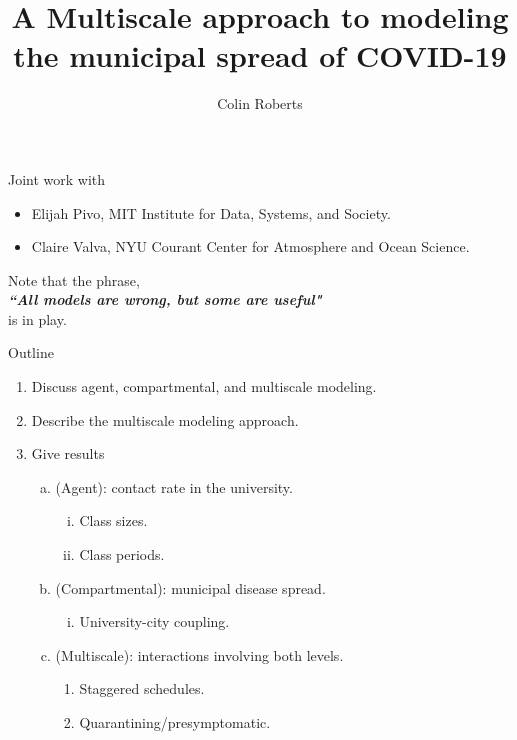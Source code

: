 \documentclass[aspectratio=169]{beamer}
\author{Colin Roberts}
\title{A Multiscale approach to modeling the municipal spread of COVID-19}
\subtitle{}
\newcommand\boldgreen[1]{\textcolor{lighter_csu_green}{\emph{\textbf{#1}}}}
\begin{document}
\begin{frame}{}
\vfill
    Joint work with
    \begin{itemize}
        \item Elijah Pivo, MIT Institute for Data, Systems, and Society.
        \item Claire Valva, NYU Courant Center for Atmosphere and Ocean Science.
    \end{itemize}
    \vfill
\end{frame}

\begin{frame}{}
\vfill
\center
    Note that the phrase,\\
    \vspace*{.5cm}
    \boldgreen{``All models are wrong, but some are useful"}\\
    \vspace*{.5cm}
    is in play.
\vfill 
\end{frame}

\begin{frame}{Outline}
\vfill
\center
    \begin{enumerate}[1.]
    \pause
        \item Discuss agent, compartmental, and multiscale modeling.
        
        \pause
        \item Describe the multiscale modeling approach.
        
        \pause
        \item Give results
        \begin{enumerate}[a.]
        \pause
            \item (Agent): contact rate in the university.
            \begin{enumerate}[i.]
            \pause
                \item Class sizes.
                
                \pause
                \item Class periods.
            \end{enumerate}
            \pause
            \item (Compartmental): municipal disease spread.
            \begin{enumerate}[i.]
            \pause
                \item University-city coupling.
            \end{enumerate}
            \pause
            \item (Multiscale): interactions involving both levels.
            \begin{enumerate}[i]
            \pause
                \item Staggered schedules.
                
                \pause
                \item Quarantining/presymptomatic.
            \end{enumerate}
        \end{enumerate}
    \end{enumerate}
\vfill
\end{frame}
\end{document}
